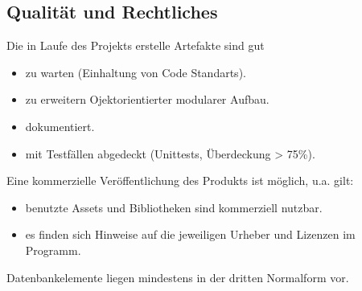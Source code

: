 \subsection{Qualität und Rechtliches}
\begin{requirements}
     Die in Laufe des Projekts erstelle Artefakte sind gut
    \begin{itemize}
        \item zu warten (Einhaltung von Code Standarts).
        \item zu erweitern Ojektorientierter modularer Aufbau.
        \item dokumentiert.
        \item mit Testfällen abgedeckt (Unittests, Überdeckung > 75\%).
    \end{itemize}
     Eine kommerzielle Veröffentlichung des Produkts ist möglich, u.a. gilt:
    \begin{itemize}
        \item benutzte Assets und Bibliotheken sind kommerziell nutzbar.
    	\item es finden sich Hinweise auf die jeweiligen Urheber und Lizenzen im Programm.
    \end{itemize}
     Datenbankelemente liegen mindestens in der dritten Normalform vor.
\end{requirements}
